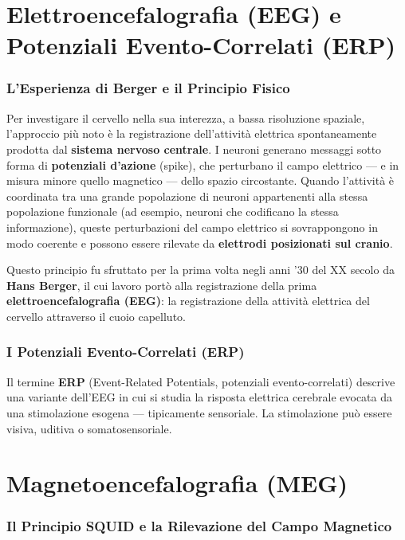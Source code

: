 \section{Elettroencefalografia (EEG) e Potenziali Evento-Correlati (ERP)}

\subsubsection{L'Esperienza di Berger e il Principio Fisico}

Per investigare il cervello nella sua interezza, a bassa risoluzione spaziale, l'approccio più noto è la registrazione dell'attività elettrica spontaneamente prodotta dal \textbf{sistema nervoso centrale}. I neuroni generano messaggi sotto forma di \textbf{potenziali d'azione} (spike), che perturbano il campo elettrico — e in misura minore quello magnetico — dello spazio circostante. Quando l'attività è coordinata tra una grande popolazione di neuroni appartenenti alla stessa popolazione funzionale (ad esempio, neuroni che codificano la stessa informazione), queste perturbazioni del campo elettrico si sovrappongono in modo coerente e possono essere rilevate da \textbf{elettrodi posizionati sul cranio}.

Questo principio fu sfruttato per la prima volta negli anni '30 del XX secolo da \textbf{Hans Berger}, il cui lavoro portò alla registrazione della prima \textbf{elettroencefalografia (EEG)}: la registrazione della attività elettrica del cervello attraverso il cuoio capelluto.

\subsubsection{I Potenziali Evento-Correlati (ERP)}

Il termine \textbf{ERP} (Event-Related Potentials, potenziali evento-correlati) descrive una variante dell'EEG in cui si studia la risposta elettrica cerebrale evocata da una stimolazione esogena — tipicamente sensoriale. La stimolazione può essere visiva, uditiva o somatosensoriale.



\section{Magnetoencefalografia (MEG)}

\subsubsection{Il Principio SQUID e la Rilevazione del Campo Magnetico}

